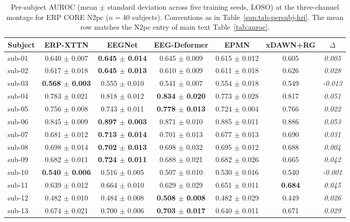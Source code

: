\begin{table}[t]
\centering
\caption{%
Per-subject AUROC (mean $\pm$ standard deviation across five training seeds, LOSO) at the three-channel montage for ERP CORE N2pc ($n = 40$ subjects). Conventions as in Table~\ref{sup:tab-persubj-hri}. The mean row matches the N2pc entry of main text Table~\ref{tab:auroc}.%
}
\label{sup:tab-persubj-n2pc}
\begin{tabular}{lcccccc}
\toprule
Subject & ERP-XTTN & EEGNet & EEG-Deformer & EPMN & xDAWN+RG & $\Delta$ \\
\midrule
sub-01 & 0.640 $\pm$ 0.007 & \textbf{0.645 $\pm$ 0.014} & 0.645 $\pm$ 0.009 & 0.615 $\pm$ 0.012 & 0.605 & \textit{0.005} \\
sub-02 & 0.617 $\pm$ 0.018 & \textbf{0.645 $\pm$ 0.013} & 0.610 $\pm$ 0.009 & 0.611 $\pm$ 0.018 & 0.626 & \textit{0.028} \\
sub-03 & \textbf{0.568 $\pm$ 0.003} & 0.555 $\pm$ 0.010 & 0.541 $\pm$ 0.007 & 0.554 $\pm$ 0.018 & 0.549 & \textit{-0.013} \\
sub-04 & 0.783 $\pm$ 0.021 & 0.818 $\pm$ 0.012 & \textbf{0.834 $\pm$ 0.020} & 0.773 $\pm$ 0.028 & 0.817 & \textit{0.051} \\
sub-05 & 0.756 $\pm$ 0.008 & 0.743 $\pm$ 0.011 & \textbf{0.778 $\pm$ 0.013} & 0.724 $\pm$ 0.004 & 0.766 & \textit{0.022} \\
sub-06 & 0.845 $\pm$ 0.009 & \textbf{0.897 $\pm$ 0.003} & 0.871 $\pm$ 0.010 & 0.885 $\pm$ 0.011 & 0.886 & \textit{0.053} \\
sub-07 & 0.681 $\pm$ 0.012 & \textbf{0.713 $\pm$ 0.014} & 0.701 $\pm$ 0.013 & 0.677 $\pm$ 0.013 & 0.690 & \textit{0.031} \\
sub-08 & 0.698 $\pm$ 0.014 & \textbf{0.702 $\pm$ 0.013} & 0.698 $\pm$ 0.032 & 0.695 $\pm$ 0.012 & 0.688 & \textit{0.004} \\
sub-09 & 0.682 $\pm$ 0.011 & \textbf{0.724 $\pm$ 0.011} & 0.688 $\pm$ 0.021 & 0.682 $\pm$ 0.026 & 0.665 & \textit{0.042} \\
sub-10 & \textbf{0.540 $\pm$ 0.006} & 0.516 $\pm$ 0.005 & 0.507 $\pm$ 0.010 & 0.530 $\pm$ 0.016 & 0.540 & \textit{-0.001} \\
sub-11 & 0.639 $\pm$ 0.012 & 0.664 $\pm$ 0.010 & 0.629 $\pm$ 0.029 & 0.651 $\pm$ 0.011 & \textbf{0.684} & \textit{0.045} \\
sub-12 & 0.482 $\pm$ 0.010 & 0.484 $\pm$ 0.008 & \textbf{0.508 $\pm$ 0.008} & 0.482 $\pm$ 0.029 & 0.449 & \textit{0.026} \\
sub-13 & 0.674 $\pm$ 0.021 & 0.700 $\pm$ 0.006 & \textbf{0.703 $\pm$ 0.017} & 0.640 $\pm$ 0.011 & 0.671 & \textit{0.029} \\

\end{tabular}
\end{table}
